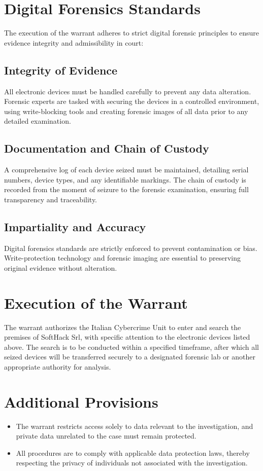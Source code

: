 \section{Digital Forensics Standards}
The execution of the warrant adheres to strict digital forensic principles to ensure evidence integrity and admissibility in court:
\subsection{Integrity of Evidence}
All electronic devices must be handled carefully to prevent any data alteration. Forensic experts are tasked with securing the devices in a controlled environment, using write-blocking tools and creating forensic images of all data prior to any detailed examination.
\subsection{Documentation and Chain of Custody}
A comprehensive log of each device seized must be maintained, detailing serial numbers, device types, and any identifiable markings. The chain of custody is recorded from the moment of seizure to the forensic examination, ensuring full transparency and traceability.
\subsection{Impartiality and Accuracy}
Digital forensics standards are strictly enforced to prevent contamination or bias. Write-protection technology and forensic imaging are essential to preserving original evidence without alteration.

\section{Execution of the Warrant}
The warrant authorizes the Italian Cybercrime Unit to enter and search the premises of SoftHack Srl, with specific attention to the electronic devices listed above. The search is to be conducted within a specified timeframe, after which all seized devices will be transferred securely to a designated forensic lab or another appropriate authority for analysis.

\section{Additional Provisions}
\begin{itemize}
    \item The warrant restricts access solely to data relevant to the investigation, and private data unrelated to the case must remain protected.
    \item All procedures are to comply with applicable data protection laws, thereby respecting the privacy of individuals not associated with the investigation.
\end{itemize}


